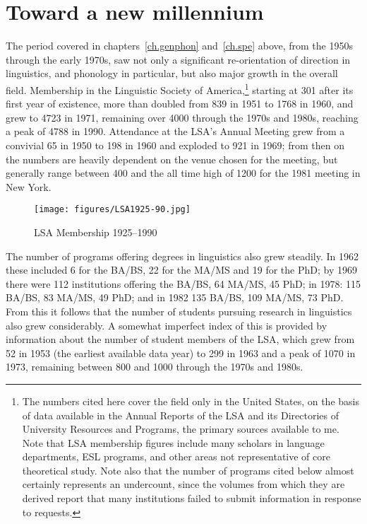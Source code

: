 \chapter{Toward a new millennium}
\label{ch.otlabphon}

The period covered in chapters~\ref{ch.genphon} and~\ref{ch.spe}
above, from the 1950s through the early 1970s, saw not only a
significant re-orientation of direction in linguistics, and phonology
in particular, but also major growth in the overall field. Membership
in the {Linguistic Society of America},\footnote{The numbers cited here
  cover the field only in the United States, on the basis of data
  available in the Annual Reports of the LSA and its Directories of
  University Resources and Programs, the primary sources available to
  me. Note that LSA membership figures include many scholars in
  language departments, ESL programs, and other areas not
  representative of core theoretical study. Note also that the number
  of programs cited below almost certainly represents an undercount,
  since the volumes from which they are derived report that many
  institutions failed to submit information in response to requests.}
starting at 301 after its first year of existence, more than doubled
from 839 in 1951 to 1768 in 1960, and grew to 4723 in 1971, remaining
over 4000 through the 1970s and 1980s, reaching a peak of 4788 in
1990. Attendance at the LSA's Annual Meeting grew from a convivial 65
in 1950 to 198 in 1960 and exploded to 921 in 1969; from then on the
numbers are heavily dependent on the venue chosen for the meeting, but
generally range between 400 and the all time high of 1200 for the 1981
meeting in New York.
\begin{figure}[h]
  \centering
  \texttt{[image: figures/LSA1925-90.jpg]}
  \caption{LSA Membership 1925--1990}
  \label{fig:lsa.membership}
\end{figure}

The number of programs offering degrees in linguistics also grew
steadily. In 1962 these included 6 for the BA/BS, 22 for the MA/MS and
19 for the PhD; by 1969 there were 112 institutions offering the
BA/BS, 64 MA/MS, 45 PhD; in 1978: 115 BA/BS, 83 MA/MS, 49 PhD; and in
1982 135 BA/BS, 109 MA/MS, 73 PhD.  From this it follows that the
number of students pursuing research in linguistics also grew
considerably. A somewhat imperfect index of this is provided by
information about the number of student members of the LSA, which grew
from 52 in 1953 (the earliest available data year) to 299 in 1963 and
a peak of 1070 in 1973, remaining between 800 and 1000 through the
1970s and 1980s.

